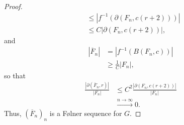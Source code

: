 \documentclass[10pt]{mypackage}
\begin{document}
\begin{proof}
\begin{align*}
                                                                   &\leq \left\vert f^{-1}\left( \partial\left( F_n,c\left( r+2 \right) \right) \right) \right\vert\\
                                                                   &\leq C\left\vert \partial\left( F_n, c\left( r+2 \right) \right) \right\vert,
  \end{align*}
  and
  \begin{align*}
    \left\vert \overline{F}_n \right\vert &= \left\vert f^{-1}\left( B\left( F_n,c \right) \right) \right\vert\\
                                          &\geq \frac{1}{C}\left\vert F_n \right\vert,
  \end{align*}
  so that
  \begin{align*}
    \frac{\left\vert \partial\left( \overline{F}_n,r \right) \right\vert}{\left\vert F_n \right\vert} &\leq C^2 \frac{\left\vert \partial\left( F_n,c\left( r+2 \right) \right) \right\vert}{\left\vert F_n \right\vert}\\
                   &\xrightarrow{n\rightarrow\infty} 0.
  \end{align*}
  Thus, $ \left( \overline{F}_n \right)_{n} $ is a Følner sequence for $G$.
\end{proof}
\end{document}
